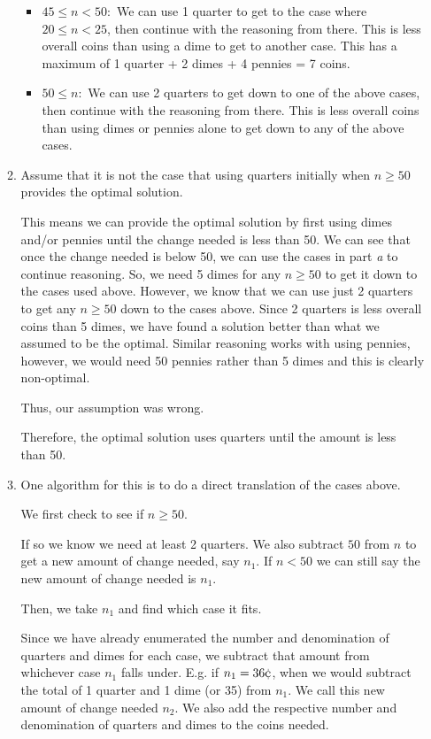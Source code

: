 \documentclass[12pt,letterpaper]{article}
\begin{document}
\begin{enumerate}
\begin{enumerate}
\begin{itemize}
            \item $45 \le n < 50 :$ We can use 1 quarter to get to the case where $20 \le n < 25$, then continue with the reasoning from there. This is less overall coins than using a dime to get to another case. This has a maximum of 1 quarter + 2 dimes + 4 pennies = 7 coins.
            \item $50 \le n:$ We can use 2 quarters to get down to one of the above cases, then continue with the reasoning from there. This is less overall coins than using dimes or pennies alone to get down to any of the above cases.
          \end{itemize}

        \item
          Assume that it is not the case that using quarters initially when $n \ge 50$ provides the optimal solution.

          This means we can provide the optimal solution by first using dimes and/or pennies until the change needed is less than 50\cent.
          We can see that once the change needed is below 50\cent, we can use the cases in part \textit{a} to continue reasoning.
          So, we need 5 dimes for any $n \ge 50$ to get it down to the cases used above.
          However, we know that we can use just 2 quarters to get any $n \ge 50$ down to the cases above.
          Since 2 quarters is less overall coins than 5 dimes, we have found a solution better than what we assumed to be the optimal.
          Similar reasoning works with using pennies, however, we would need 50 pennies rather than 5 dimes and this is clearly non-optimal.

          Thus, our assumption was wrong.

          Therefore, the optimal solution uses quarters until the amount is less than 50\cent.

        \item
          One algorithm for this is to do a direct translation of the cases above.

          We first check to see if $n \ge 50$.

          If so we know we need at least 2 quarters.
          We also subtract $50$ from $n$ to get a new amount of change needed, say $n_1$.
          If $n < 50$ we can still say the new amount of change needed is $n_1$.

          Then, we take $n_1$ and find which case it fits.

          Since we have already enumerated the number and denomination of quarters and dimes for each case,
          we subtract that amount from whichever case $n_1$ falls under.
          E.g. if $n_1 = 36\text{\cent}$, when we would subtract the total of 1 quarter and 1 dime (or 35\cent) from $n_1$.
          We call this new amount of change needed $n_2$.
          We also add the respective number and denomination of quarters and dimes to the coins needed.


\end{enumerate}
\end{enumerate}
\end{document}
